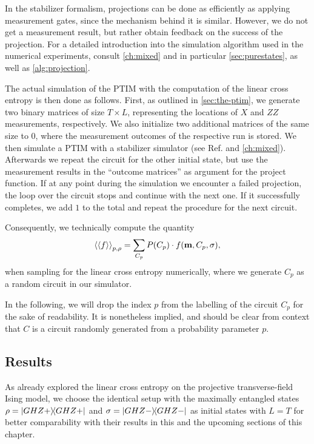 In the stabilizer
formalism, projections can be done as efficiently as applying measurement
gates,
since the mechanism behind it is similar. However, we do not get a measurement
result, but rather obtain feedback on the success of the projection.
For a detailed introduction into the
simulation algorithm used in the numerical experiments, consult \cref{ch:mixed}
and in particular \cref{sec:purestates}, as well as \cref{alg:projection}.

The actual simulation of the PTIM with the computation of the linear cross
entropy is then done as follows. First, as outlined in \cref{sec:the-ptim},
we generate two binary matrices of size $T\times L$, representing the
locations of $X$ and $ZZ$ measurements, respectively. We also initialize two
additional matrices of the same size to 0, where the measurement outcomes of
the respective run is stored. We then simulate a PTIM with a stabilizer
simulator (see Ref. \cite{langCliffordCircuitSimulator2022} and
\cref{ch:mixed}). Afterwards we repeat the
circuit for the other initial state, but use the measurement results in the
\enquote{outcome matrices} as argument for the project function. If at any
point during the simulation we encounter a failed projection, the loop over the
circuit stops and continue with the next one. If it successfully completes, we
add $1$ to the total and repeat the procedure for the next circuit.

Consequently, we technically compute the quantity
\begin{align}\label{eq:sample-f-C}
  \expval{\expval{f}}_{p,\rho} = \sum_{C_p} P(C_p) \cdot f(\mathbf{m},C_p,
  \sigma)
,\end{align}
when sampling for the linear cross entropy numerically, where we generate $C_p$
as a random circuit in our simulator. 

In the following, we will drop the index $p$ from the labelling of the circuit
$C_p$ for the sake of readability. It is nonetheless implied, and should be
clear from context that $C$ is a circuit randomly generated from a probability
parameter $p$.

\subsection{Results}

As \cite{tikhanovskayaUniversalityCrossEntropy2023} already explored
the linear cross entropy on the projective transverse-field Ising model, we
choose the identical setup with the maximally entangled states $\rho = \dyad{GHZ+}$ and
$\sigma = \dyad{GHZ-}$ as initial states with $L=T$ for better comparability
with their results in this and the upcoming sections of this chapter.

